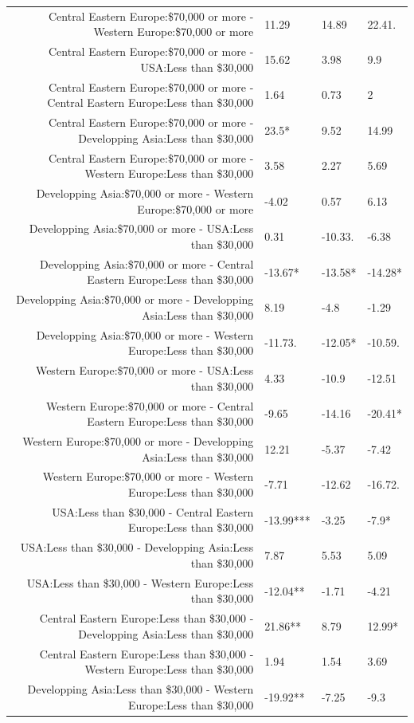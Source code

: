 \documentclass[]{report}
\begin{document}
\begin{table}[ht]
{\begin{tabular}{rlll}
		Central Eastern Europe:\$70,000 or more - Western Europe:\$70,000 or more & 11.29 & 14.89 & 22.41. \\ 
		Central Eastern Europe:\$70,000 or more - USA:Less than \$30,000 & 15.62 & 3.98 & 9.9 \\ 
		Central Eastern Europe:\$70,000 or more - Central Eastern Europe:Less than \$30,000 & 1.64 & 0.73 & 2 \\ 
		Central Eastern Europe:\$70,000 or more - Developping Asia:Less than \$30,000 & 23.5* & 9.52 & 14.99 \\ 
		Central Eastern Europe:\$70,000 or more - Western Europe:Less than \$30,000 & 3.58 & 2.27 & 5.69 \\ 
		Developping Asia:\$70,000 or more - Western Europe:\$70,000 or more & -4.02 & 0.57 & 6.13 \\ 
		Developping Asia:\$70,000 or more - USA:Less than \$30,000 & 0.31 & -10.33. & -6.38 \\ 
		Developping Asia:\$70,000 or more - Central Eastern Europe:Less than \$30,000 & -13.67* & -13.58* & -14.28* \\ 
		Developping Asia:\$70,000 or more - Developping Asia:Less than \$30,000 & 8.19 & -4.8 & -1.29 \\ 
		Developping Asia:\$70,000 or more - Western Europe:Less than \$30,000 & -11.73. & -12.05* & -10.59. \\ 
		Western Europe:\$70,000 or more - USA:Less than \$30,000 & 4.33 & -10.9 & -12.51 \\ 
		Western Europe:\$70,000 or more - Central Eastern Europe:Less than \$30,000 & -9.65 & -14.16 & -20.41* \\ 
		Western Europe:\$70,000 or more - Developping Asia:Less than \$30,000 & 12.21 & -5.37 & -7.42 \\ 
		Western Europe:\$70,000 or more - Western Europe:Less than \$30,000 & -7.71 & -12.62 & -16.72. \\ 
		USA:Less than \$30,000 - Central Eastern Europe:Less than \$30,000 & -13.99*** & -3.25 & -7.9* \\ 
		USA:Less than \$30,000 - Developping Asia:Less than \$30,000 & 7.87 & 5.53 & 5.09 \\ 
		USA:Less than \$30,000 - Western Europe:Less than \$30,000 & -12.04** & -1.71 & -4.21 \\ 
		Central Eastern Europe:Less than \$30,000 - Developping Asia:Less than \$30,000 & 21.86** & 8.79 & 12.99* \\ 
		Central Eastern Europe:Less than \$30,000 - Western Europe:Less than \$30,000 & 1.94 & 1.54 & 3.69 \\ 
		Developping Asia:Less than \$30,000 - Western Europe:Less than \$30,000 & -19.92** & -7.25 & -9.3 \\ 
		\hline
	\end{tabular}}
\end{table}
\end{document}
